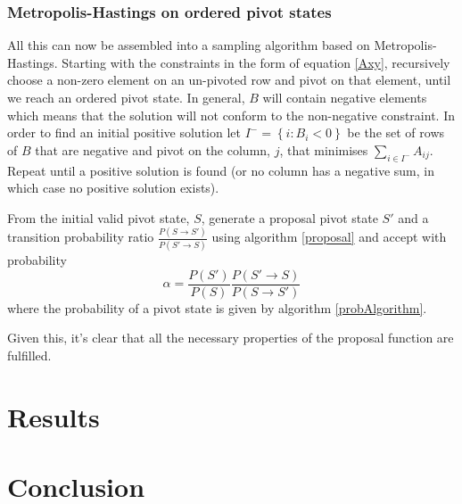 \documentclass{article}
\begin{document}
\subsubsection{Metropolis-Hastings on ordered pivot states}

All this can now be assembled into a sampling algorithm based on Metropolis-Hastings. Starting with the constraints in the form of equation \ref{Axy}, recursively choose a non-zero element on an un-pivoted row and pivot on that element, until we reach an ordered pivot state. In general, $B$ will contain negative elements which means that the solution will not conform to the non-negative constraint. In order to find an initial positive solution let $I^- = \left\{i: B_i < 0\right\}$ be the set of rows of $B$ that are negative and pivot on the column, $j$, that minimises $\sum_{i\in I^-}A_{ij}$. Repeat until a positive solution is found (or no column has a negative sum, in which case no positive solution exists).

From the initial valid pivot state, $S$, generate a proposal pivot state $S'$ and a transition probability ratio $\frac{P(S\rightarrow S')}{P(S' \rightarrow S)}$ using algorithm \ref{proposal} and accept with probability
\[
\alpha = \frac{P(S')}{P(S)}\frac{P(S'\rightarrow S)}{P(S \rightarrow S')}
\]
where the probability of a pivot state is given by algorithm \ref{probAlgorithm}.

Given this, it's clear that all the necessary properties of the proposal function are fulfilled.

\section{Results}

\section{Conclusion}


%
% 


\end{document}
